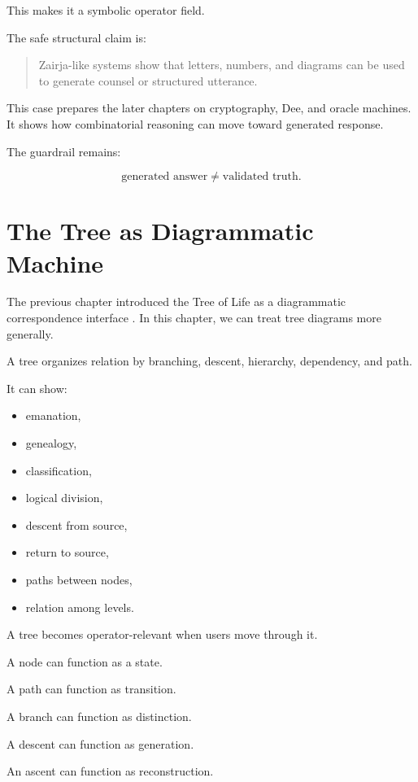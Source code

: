 \documentclass[11pt]{book}
\begin{document}
This makes it a symbolic operator field.

The safe structural claim is:

\begin{quote}
Zairja-like systems show that letters, numbers, and diagrams can be used to generate counsel or structured utterance.
\end{quote}

This case prepares the later chapters on cryptography, Dee, and oracle machines. It shows how combinatorial reasoning can move toward generated response.

The guardrail remains:

\[
\text{generated answer} \neq \text{validated truth}.
\]

\section{The Tree as Diagrammatic Machine}

The previous chapter introduced the Tree of Life as a diagrammatic correspondence interface \cite{Scholem1974Kabbalah,Idel1988KabbalahNewPerspectives}. In this chapter, we can treat tree diagrams more generally.

A tree organizes relation by branching, descent, hierarchy, dependency, and path.

It can show:

\begin{itemize}
    \item emanation,
    \item genealogy,
    \item classification,
    \item logical division,
    \item descent from source,
    \item return to source,
    \item paths between nodes,
    \item relation among levels.
\end{itemize}

A tree becomes operator-relevant when users move through it.

A node can function as a state.

A path can function as transition.

A branch can function as distinction.

A descent can function as generation.

An ascent can function as reconstruction.
\end{document}
